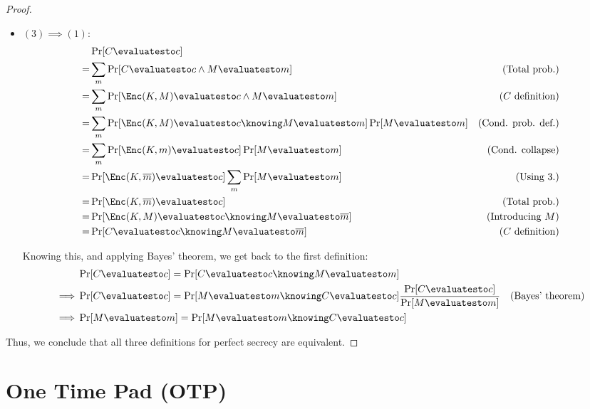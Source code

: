 \begin{proof}
\begin{itemize}
        \item $(3) \implies (1)$:
        \begin{align*}
            & \Pr[C \evaluatesto c] & \\
            =& \sum_{m}\Pr[C \evaluatesto c \wedge M \evaluatesto m] & \text{(Total prob.)} \\
            =& \sum_{m}\Pr[\Enc(K, M) \evaluatesto c \wedge M \evaluatesto m] & \text{($C$ definition)} \\
            =& \sum_{m}\Pr[\Enc(K, M) \evaluatesto c \knowing M \evaluatesto m]\Pr[M \evaluatesto m] & \text{(Cond. prob. def.)} \\
            =& \sum_{m}\Pr[\Enc(K, m) \evaluatesto c]\Pr[M \evaluatesto m] & \text{(Cond. collapse)} \\
            =& \Pr[\Enc(K, \overline{m}) \evaluatesto c] \sum_{m}\Pr[M \evaluatesto m] & \text{(Using 3.)} \\ %
            =& \Pr[\Enc(K, \overline{m}) \evaluatesto c] & \text{(Total prob.)} \\
            =& \Pr[\Enc(K, M) \evaluatesto c \knowing M \evaluatesto \overline{m}] & \text{(Introducing $M$)} \\
            =& \Pr[C \evaluatesto c \knowing M \evaluatesto \overline{m}] & \text{($C$ definition)}
        \end{align*}

        Knowing this, and applying Bayes' theorem, we get back to the first definition:
        \begin{align*}
            & \Pr[C \evaluatesto c] = \Pr[C \evaluatesto c \knowing M \evaluatesto m] & \\
            \implies& \Pr[C \evaluatesto c] = \Pr[M \evaluatesto m \knowing C \evaluatesto c]\frac{\Pr[C \evaluatesto c]}{\Pr[M \evaluatesto m]} & \text{(Bayes' theorem)} \\
            \implies& \Pr[M \evaluatesto m] = \Pr[M \evaluatesto m \knowing C \evaluatesto c] &
        \end{align*}

    \end{itemize}

    Thus, we conclude that all three definitions for perfect secrecy are equivalent.

\end{proof}

\section{One Time Pad (OTP)}

